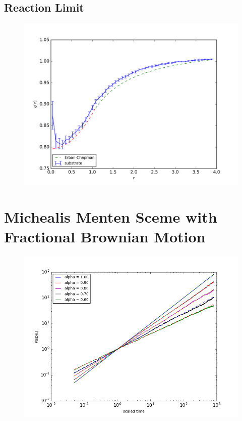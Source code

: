 \documentclass[
  a4paper,BCOR10mm,oneside,
  bibtotoc,idxtotoc,
  headsepline,footsepline,%
  fleqn,openbib
]{scrbook}
\begin{document}
\subsection{Reaction Limit}
\begin{figure}[h!]
  \centering
  \includegraphics[width=\textwidth]{./data/chapman-limit-radial.png}
  \captionsetup{width=\linewidth}
  \label{fig:diffusion_limit-Erban-Chapmann_radial}
\end{figure}

\section{Michealis Menten Sceme with Fractional Brownian Motion}
\begin{figure}[h!]
  \centering
  \includegraphics[width=\textwidth]{./data/differentalphamsdrevreaddy.png}
  \captionsetup{width=\linewidth}
  \label{fig:differentalpharevreaddymsd}
\end{figure}
\end{document}
